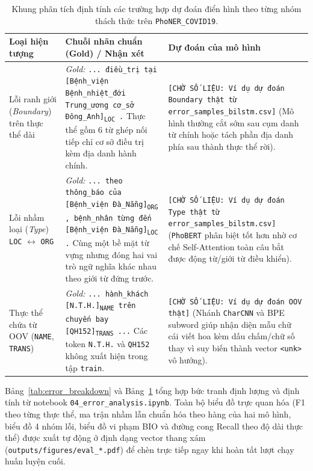 \documentclass[11pt,a4paper,twocolumn]{article}
\begin{document}
\begin{table}[t]
\centering
\small
\begin{tabular}{p{2.5cm}p{6.2cm}p{6.2cm}}
\hline
\textbf{Loại hiện tượng} & \textbf{Chuỗi nhãn chuẩn (Gold) / Nhận xét} & \textbf{Dự đoán của mô hình} \\
\hline
Lỗi ranh giới (\textit{Boundary}) trên thực thể dài &
\textit{Gold:} \texttt{... điều\_trị tại [Bệnh\_viện Bệnh\_nhiệt\_đới Trung\_ương cơ\_sở Đông\_Anh]\textsubscript{LOC} .}\newline
Thực thể gồm $6$ từ ghép nối tiếp chỉ cơ sở điều trị kèm địa danh hành chính. &
\texttt{[CHỜ SỐ LIỆU: Ví dụ dự đoán Boundary thật từ error\_samples\_bilstm.csv]} (Mô hình thường cắt sớm sau cụm danh từ chính hoặc tách phần địa danh phía sau thành thực thể rời). \\
\hline
Lỗi nhầm loại (\textit{Type}) \texttt{LOC} $\leftrightarrow$ \texttt{ORG} &
\textit{Gold:} \texttt{... theo thông\_báo của [Bệnh\_viện Đà\_Nẵng]\textsubscript{ORG} , bệnh\_nhân từng đến [Bệnh\_viện Đà\_Nẵng]\textsubscript{LOC} .}\newline
Cùng một bề mặt từ vựng nhưng đóng hai vai trò ngữ nghĩa khác nhau theo giới từ đứng trước. &
\texttt{[CHỜ SỐ LIỆU: Ví dụ dự đoán Type thật từ error\_samples\_bilstm.csv]} (\texttt{PhoBERT} phân biệt tốt hơn nhờ cơ chế Self-Attention toàn câu bắt được động từ/giới từ điều khiển). \\
\hline
Thực thể chứa từ OOV (\texttt{NAME}, \texttt{TRANS}) &
\textit{Gold:} \texttt{... hành\_khách [N.T.H.]\textsubscript{NAME} trên chuyến bay [QH152]\textsubscript{TRANS} ...}\newline
Các token \texttt{N.T.H.} và \texttt{QH152} không xuất hiện trong tập \texttt{train}. &
\texttt{[CHỜ SỐ LIỆU: Ví dụ dự đoán OOV thật]} (Nhánh \texttt{CharCNN} và BPE subword giúp nhận diện mẫu chữ cái viết hoa kèm dấu chấm/chữ số thay vì suy biến thành vector \texttt{<unk>} vô hướng). \\
\hline
\end{tabular}
\caption{Khung phân tích định tính các trường hợp dự đoán điển hình theo từng nhóm thách thức trên \texttt{PhoNER\_COVID19}.}
\label{tab:qualitative_examples}
\end{table}

Bảng~\ref{tab:error_breakdown} và Bảng~\ref{tab:qualitative_examples} tổng hợp bức tranh định lượng và định tính từ notebook \texttt{04\_error\_analysis.ipynb}. Toàn bộ biểu đồ trực quan hóa (F1 theo từng thực thể, ma trận nhầm lẫn chuẩn hóa theo hàng của hai mô hình, biểu đồ 4 nhóm lỗi, biểu đồ vi phạm BIO và đường cong Recall theo độ dài thực thể) được xuất tự động ở định dạng vector thang xám (\texttt{outputs/figures/eval\_*.pdf}) để chèn trực tiếp ngay khi hoàn tất lượt chạy huấn luyện cuối.
\end{document}

